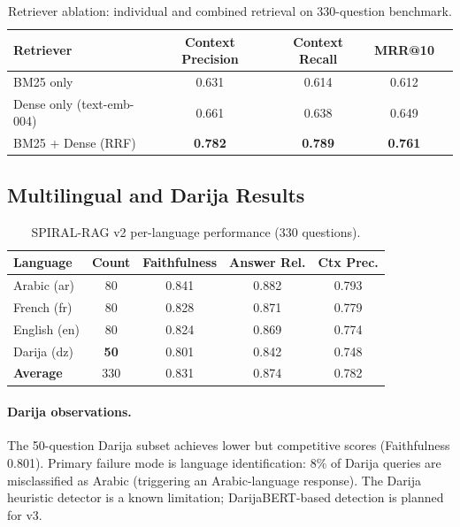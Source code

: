 \documentclass[12pt,a4paper]{article}
\begin{document}
\begin{table}[H]
\centering
\caption{Retriever ablation: individual and combined retrieval on 330-question benchmark.}
\label{tab:retriever_ablation}
\begin{tabular}{lcccc}
\toprule
\textbf{Retriever} & \textbf{Context Precision} & \textbf{Context Recall} & \textbf{MRR@10} \\
\midrule
BM25 only                  & 0.631 & 0.614 & 0.612 \\
Dense only (text-emb-004)  & 0.661 & 0.638 & 0.649 \\
BM25 + Dense (RRF)         & \textbf{0.782} & \textbf{0.789} & \textbf{0.761} \\
\bottomrule
\end{tabular}
\end{table}

\subsection{Multilingual and Darija Results}

\begin{table}[H]
\centering
\caption{SPIRAL-RAG v2 per-language performance (330 questions).}
\label{tab:multilingual_v2}
\begin{tabular}{lcccc}
\toprule
\textbf{Language} & \textbf{Count} & \textbf{Faithfulness} & \textbf{Answer Rel.} & \textbf{Ctx Prec.} \\
\midrule
Arabic (ar)     & 80  & 0.841 & 0.882 & 0.793 \\
French (fr)     & 80  & 0.828 & 0.871 & 0.779 \\
English (en)    & 80  & 0.824 & 0.869 & 0.774 \\
Darija (dz)     & \textbf{50}  & 0.801 & 0.842 & 0.748 \\
\midrule
\textbf{Average}& 330 & 0.831 & 0.874 & 0.782 \\
\bottomrule
\end{tabular}
\end{table}

\paragraph{Darija observations.} The 50-question Darija subset achieves lower
but competitive scores (Faithfulness 0.801). Primary failure mode is language
identification: 8\% of Darija queries are misclassified as Arabic (triggering an
Arabic-language response). The Darija heuristic detector is a known limitation;
DarijaBERT-based detection is planned for v3.
\end{document}

